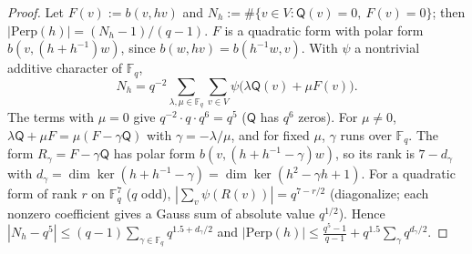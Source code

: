 \documentclass[11pt]{amsart}
\theoremstyle{plain}
\theoremstyle{definition}
\theoremstyle{remark}
\newcommand{\F}{\mathbb{F}}
\newcommand{\Q}{\mathsf{Q}}
\newcommand{\Perp}{\mathrm{Perp}}
\begin{document}
\begin{proof}
Let $F(v) := b(v, hv)$ and $N_h := \#\{v \in V : \Q(v) = 0,\ F(v) = 0\}$; then $|\Perp(h)| = (N_h - 1)/(q-1)$. $F$ is a
quadratic form with polar form $b(v, (h + h^{-1})w)$, since $b(w, hv) = b(h^{-1}w, v)$. With $\psi$ a nontrivial
additive character of $\F_q$,
\[
N_h = q^{-2} \sum_{\lambda, \mu \in \F_q} \sum_{v \in V} \psi\bigl(\lambda \Q(v) + \mu F(v)\bigr).
\]
The terms with $\mu = 0$ give $q^{-2} \cdot q \cdot q^6 = q^5$ ($\Q$ has $q^6$ zeros). For $\mu \ne 0$,
$\lambda\Q + \mu F = \mu(F - \gamma\Q)$ with $\gamma = -\lambda/\mu$, and for fixed $\mu$, $\gamma$ runs over $\F_q$.
The form $R_\gamma = F - \gamma\Q$ has polar form $b(v, (h + h^{-1} - \gamma)w)$, so its rank is $7 - d_\gamma$ with
$d_\gamma = \dim\ker(h + h^{-1} - \gamma) = \dim\ker(h^2 - \gamma h + 1)$. For a quadratic form of rank $r$ on
$\F_q^7$ ($q$ odd), $|\sum_v \psi(R(v))| = q^{7 - r/2}$ (diagonalize; each nonzero coefficient gives a Gauss sum of
absolute value $q^{1/2}$). Hence $|N_h - q^5| \le (q-1)\sum_{\gamma \in \F_q} q^{1.5 + d_\gamma/2}$ and
$|\Perp(h)| \le \frac{q^5-1}{q-1} + q^{1.5}\sum_\gamma q^{d_\gamma/2}$.


\end{proof}
\end{document}
